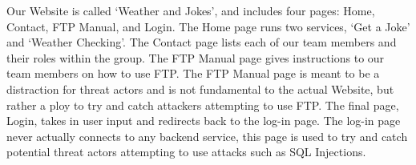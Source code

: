 
Our Website is called ‘Weather and Jokes’, and includes four pages: Home, Contact, FTP Manual, and Login. The Home page runs two services, ‘Get a Joke’ and ‘Weather Checking’. The Contact page lists each of our team members and their roles within the group. The FTP Manual page gives instructions to our team members on how to use FTP. The FTP Manual page is meant to be a distraction for threat actors and is not fundamental to the actual Website, but rather a ploy to try and catch attackers attempting to use FTP. The final page, Login, takes in user input and redirects back to the log-in page. The log-in page never actually connects to any backend service, this page is used to try and catch potential threat actors attempting to use attacks such as SQL Injections.
